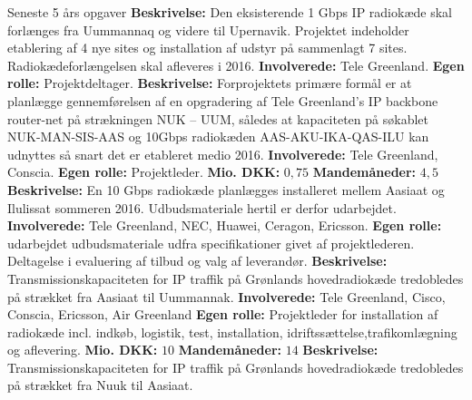 \begin{rubric}{Seneste 5 års opgaver}
%
\entry*[okt 2015 - ] \textbf{Beskrivelse:} Den eksisterende 1 Gbps IP radiokæde skal forlænges fra Uummannaq og videre til Upernavik. Projektet indeholder etablering af 4 nye sites og installation af udstyr på sammenlagt 7 sites. Radiokædeforlængelsen skal afleveres i 2016.
\entry* \textbf{Involverede:} Tele Greenland.
\entry* \textbf{Egen rolle:} Projektdeltager.
%
\entry*[sep 2015 -] \textbf{Beskrivelse:} Forprojektets primære formål er at planlægge gennemførelsen af en opgradering af Tele Greenland's IP backbone router-net på strækningen NUK – UUM, således at kapaciteten på søkablet NUK-MAN-SIS-AAS og 10Gbps radiokæden AAS-AKU-IKA-QAS-ILU kan udnyttes så snart det er etableret medio 2016.
\entry* \textbf{Involverede:} Tele Greenland, Conscia.
\entry* \textbf{Egen rolle:} Projektleder.
\entry* \textbf{Mio. DKK:} $0,75$
\entry* \textbf{Mandemåneder:} $4,5$
%
 \textbf{Beskrivelse:} En 10 Gbps radiokæde planlægges installeret mellem Aasiaat og Ilulissat sommeren 2016. Udbudsmateriale hertil er derfor udarbejdet.
\entry* \textbf{Involverede:} Tele Greenland, NEC, Huawei, Ceragon, Ericsson.
\entry* \textbf{Egen rolle:} udarbejdet udbudsmateriale udfra specifikationer givet af projektlederen. Deltagelse i evaluering af tilbud og valg af leverandør.
%
%
 \textbf{Beskrivelse:} Transmissionskapaciteten for IP traffik på Grønlands hovedradiokæde tredobledes på strækket fra Aasiaat til Uummannak.
\entry* \textbf{Involverede:} Tele Greenland, Cisco, Conscia, Ericsson, Air Greenland
\entry* \textbf{Egen rolle:} Projektleder for installation af radiokæde incl. indkøb, logistik, test, installation, idriftssættelse,trafikomlægning og aflevering.
\entry* \textbf{Mio. DKK:} $10$
\entry* \textbf{Mandemåneder:} $14$
%
 \textbf{Beskrivelse:} Transmissionskapaciteten for IP traffik på Grønlands hovedradiokæde tredobledes på strækket fra Nuuk til Aasiaat.

\end{rubric}
